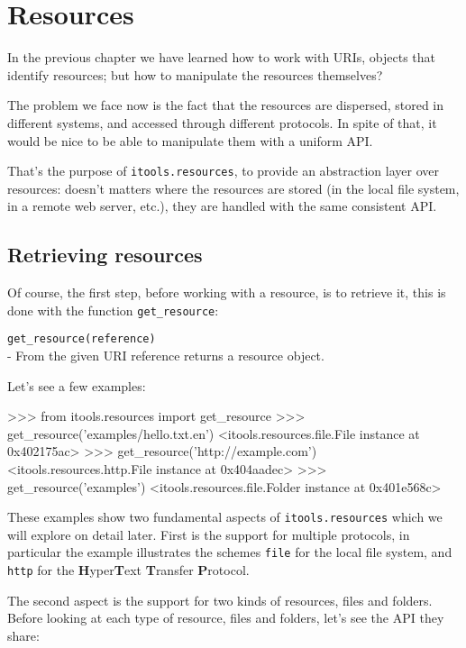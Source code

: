 \chapter{Resources}

In the previous chapter we have learned how to work with URIs, objects that
identify resources; but how to manipulate the resources themselves?

The problem we face now is the fact that the resources are dispersed, stored
in different systems, and accessed through different protocols. In spite of
that, it would be nice to be able to manipulate them with a uniform API.

That's the purpose of {\tt itools.resources}, to provide an abstraction layer
over resources: doesn't matters where the resources are stored (in the local
file system, in a remote web server, etc.), they are handled with the same
consistent API.

\section{Retrieving resources}

Of course, the first step, before working with a resource, is to retrieve it,
this is done with the function {\tt get\_resource}:

\begin{api}
  {\tt get\_resource(reference)}\\
  - From the given URI reference returns a resource object.
\end{api}

Let's see a few examples:

\begin{code}
    >>> from itools.resources import get_resource
    >>> get_resource('examples/hello.txt.en')
    <itools.resources.file.File instance at 0x402175ac>
    >>> get_resource('http://example.com')
    <itools.resources.http.File instance at 0x404aadec>
    >>> get_resource('examples')
    <itools.resources.file.Folder instance at 0x401e568c>
\end{code}

These examples show two fundamental aspects of {\tt itools.resources} which
we will explore on detail later. First is the support for multiple protocols,
in particular the example illustrates the schemes {\tt file} for the local
file system, and {\tt http} for the {\bf H}yper{\bf T}ext {\bf T}ransfer
{\bf P}rotocol.

The second aspect is the support for two kinds of resources, files and folders.
Before looking at each type of resource, files and folders, let's see the API
they share:

